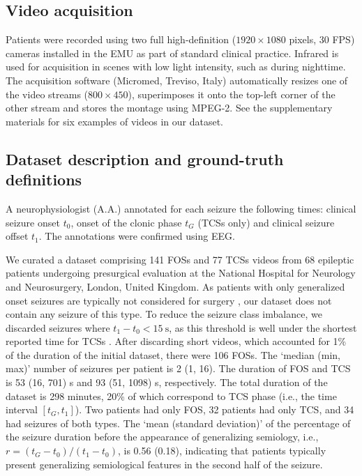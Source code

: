\subsection{Video acquisition}

Patients were recorded using two full high-definition ($1920 \times 1080$ pixels, 30 \ac{FPS}) cameras installed in the \ac{EMU} as part of standard clinical practice.
Infrared is used for acquisition in scenes with low light intensity, such as during nighttime.
The acquisition software (Micromed, Treviso, Italy) automatically resizes one of the video streams ($800 \times 450$), superimposes it onto the top-left corner of the other stream and stores the montage using MPEG-2.
See the supplementary materials for six examples of videos in our dataset.


\subsection{Dataset description and ground-truth definitions}
\label{sec:dataset}

A neurophysiologist (A.A.) annotated for each seizure the following times: clinical seizure onset $t_0$, onset of the clonic phase $t_G$ (\acp{TCS} only) and clinical seizure offset $t_1$.
The annotations were confirmed using \ac{EEG}.

We curated a dataset comprising 141 \acp{FOS} and 77 \acp{TCS} videos from 68 epileptic patients undergoing presurgical evaluation at the National Hospital for Neurology and Neurosurgery, London, United Kingdom.
As patients with only generalized onset seizures are typically not considered for surgery \cite{duncan_brain_2016}, our dataset does not contain any seizure of this type.  %
To reduce the seizure class imbalance, we discarded seizures where $t_1 - t_0 < \SI{15}{\second}$, as this threshold is well under the shortest reported time for \acp{TCS} \cite{jenssen_how_2006}.
After discarding short videos, which accounted for 1\% of the duration of the initial dataset, there were 106 \acp{FOS}.
The `median (min, max)' number of seizures per patient is 2 (1, 16).
The duration of \ac{FOS} and \ac{TCS} is 53 (16, 701) s and 93 (51, 1098) s, respectively.
The total duration of the dataset is 298 minutes, 20\% of which correspond to \ac{TCS} phase (i.e., the time interval $[t_G, t_1]$).
Two patients had only \ac{FOS}, 32 patients had only \ac{TCS}, and 34 had seizures of both types.
The `mean (standard deviation)' of the percentage of the seizure duration before the appearance of generalizing semiology, i.e., $r = (t_G - t_0) / (t_1 - t_0)$, is 0.56 (0.18), indicating that patients typically present generalizing semiological features in the second half of the seizure.

